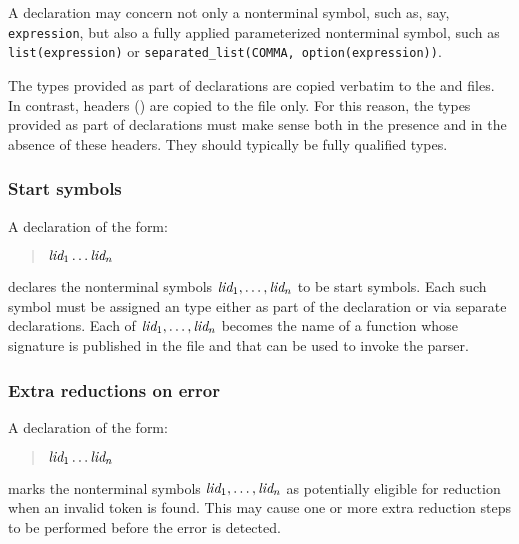 \documentclass[onecolumn,11pt,nocopyrightspace,preprint]{sigplanconf}
\begin{document}
A \dtype declaration may concern not only a nonterminal symbol, such as, say,
\texttt{expression}, but also a fully applied parameterized nonterminal
symbol, such as \texttt{list(expression)} or \texttt{separated\_list(COMMA,
  option(expression))}.

The types provided as part of \dtype declarations are copied verbatim to the
\ml and \mli files. In contrast, headers () are copied
to the \ml file only. For this reason, the types provided as part of \dtype
declarations must make sense both in the presence and in the absence of these
headers. They should typically be fully qualified types.


\subsubsection{Start symbols}
\label{sec:start}

A declaration of the form:
\begin{quote}
\dstart \optional{\ocamltype} $\textit{lid}_1 \ldots \textit{lid}_n$
\end{quote}
declares the nonterminal symbols $\textit{lid}_1, \ldots, \textit{lid}_n$ to be
start symbols. Each such symbol must be assigned an \ocaml type either as
part of the \dstart declaration or via separate \dtype declarations. Each
of $\textit{lid}_1, \ldots, \textit{lid}_n$ becomes the name of a function whose
signature is published in the \mli file and that can be used to invoke
the parser.

\subsubsection{Extra reductions on error}
\label{sec:onerrorreduce}

A declaration of the form:
\begin{quote}
\donerrorreduce $\textit{lid}_1 \ldots \textit{lid}_n$
\end{quote}
marks the nonterminal symbols $\textit{lid}_1, \ldots, \textit{lid}_n$ as
potentially eligible for reduction when an invalid token is found.
This may cause one or more extra reduction steps to be performed
before the error is detected.
\end{document}

